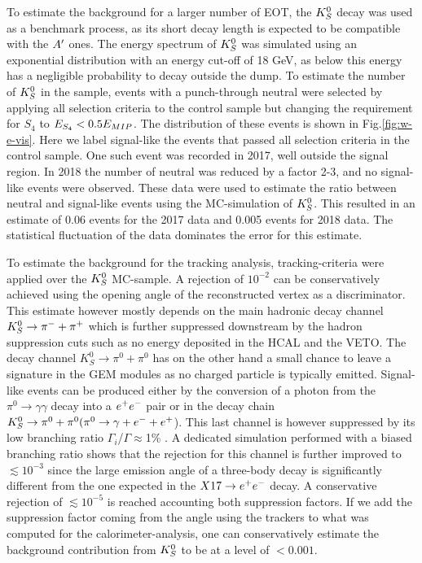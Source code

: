 To estimate the background for a larger number of EOT, the $K^0_S$ decay was used as a benchmark process, as its short decay length is expected to be compatible with the $A'$ ones. The energy spectrum of $K^0_S$ was simulated using an exponential distribution with an energy cut-off of 18 GeV, as below this energy has a negligible probability to decay outside the dump. To estimate the number of $K^0_S$ in the sample, events with a punch-through neutral were selected by applying all selection criteria to the control sample but changing the requirement for $S_4$ to $E_{S_4} < 0.5 E_{MIP}$. The distribution of these events is shown in Fig.\ref{fig:w-e-vis}. Here we label signal-like the events that passed all selection criteria in the control sample. One such event was recorded in 2017, well outside the signal region. In 2018 the number of neutral was reduced by a factor 2-3, and no signal-like events were observed. These data were used to estimate the ratio between neutral and signal-like events using the MC-simulation of $K^0_S$. This resulted in an estimate of 0.06 events for the 2017 data and 0.005 events for 2018 data. The statistical fluctuation of the data dominates the error for this estimate.

To estimate the background for the tracking analysis, tracking-criteria were applied over the $K^0_S$ MC-sample. A rejection of $10^{-2}$ can be conservatively achieved using the opening angle of the reconstructed vertex as a discriminator. This estimate however mostly depends on the main hadronic decay channel $K^0_S \rightarrow \pi^- + \pi^+$ which is further suppressed downstream by the hadron suppression cuts such as no energy deposited in the HCAL and the VETO. The decay channel $K^0_S \rightarrow \pi^0 + \pi^0$ has on the other hand a small chance to leave a signature in the GEM modules as no charged particle is typically emitted. Signal-like events can be produced either by the conversion of a photon from the $\pi^0 \rightarrow \gamma \gamma$ decay into a $e^+e^-$ pair or in the decay chain $K^0_S \rightarrow \pi^0 + \pi^0 (\pi^0 \rightarrow \gamma + e^- + e^+$). This last channel is however suppressed by its low branching ratio $\Gamma_i$/$\Gamma \approx $1\% \cite{review-particle-physics}. A dedicated simulation performed with a biased branching ratio shows that the rejection for this channel is further improved to $\lesssim 10^{-3}$ since the large emission angle of a three-body decay is significantly different from the one expected in the $X17 \rightarrow e^+ e^-$ decay. A conservative rejection of $\lesssim 10^{-5}$ is reached accounting both suppression factors. If we add the suppression factor coming from the angle using the trackers to what was computed for the calorimeter-analysis, one can conservatively estimate the background contribution from $K^0_S$ to be at a level of $<0.001$.


